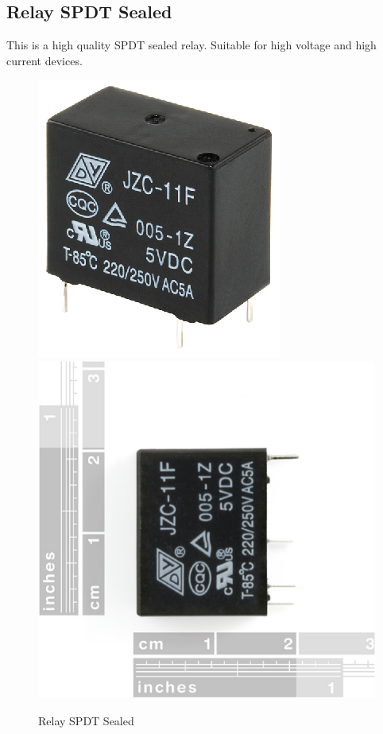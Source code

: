 \documentclass[12pt,a4paper]{report}
\begin{document}
\subsection{Relay SPDT Sealed}
This is a high quality SPDT sealed relay. Suitable for high voltage and high current devices. \cite{website:relay}
\ \\
\begin{figure}[H]
\centering
    \includegraphics*[scale=0.5]{realy}
    \includegraphics*[scale=0.2]{relay_2}
    \caption{Relay SPDT Sealed}
\end{figure}
\end{document}
